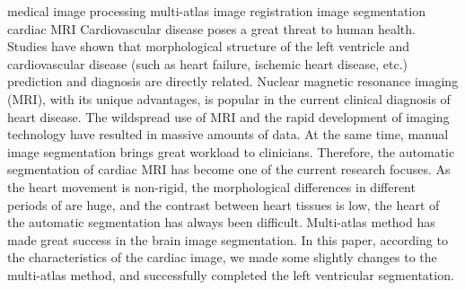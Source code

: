 
\begin{Eabstract}%
{medical image processing}%
{multi-atlas}%
{image registration}%
{image segmentation}%
{cardiac MRI}
  Cardiovascular disease poses a great threat to human health.
  Studies have shown that morphological structure of the left ventricle
  and cardiovascular disease
  (such as heart failure, ischemic heart disease, etc.)
  prediction and diagnosis are directly related.
  Nuclear magnetic resonance imaging (MRI), with its unique advantages,
  is popular in the current clinical diagnosis of heart disease.
  The wildspread use of MRI
  and the rapid development of imaging technology
  have resulted in massive amounts of data.
  At the same time,
  manual image segmentation brings great workload to clinicians.
  Therefore,
  the automatic segmentation of cardiac MRI 
  has become one of the current research focuses.
  As the heart movement is non-rigid,
  the morphological differences in different periods of are huge,
  and the contrast between heart tissues is low,
  the heart of the automatic segmentation has always been difficult.
  Multi-atlas method has made great success in the brain image segmentation.
  In this paper, according to the characteristics of the cardiac image,
  we made some slightly changes to the multi-atlas method,
  and successfully completed the left ventricular segmentation.
\end{Eabstract}
